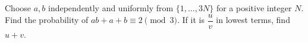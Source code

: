 Choose $a,b$ independently and uniformly from $\{1,\ldots,3N\}$ for a positive integer $N$. Find the probability of $ab+a+b\equiv 2\pmod 3$. If it is $\dfrac{u}{v}$ in lowest terms, find $u+v$.
